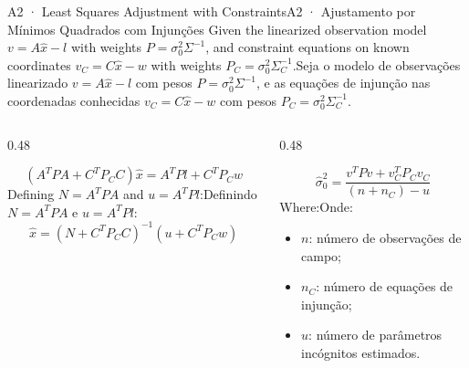 \documentclass[aspectratio=169,11pt]{beamer}
\newcommand{\tr}[2]{\ifEN#2\else#1\fi}
\begin{document}
\begin{frame}{\tr{A2 · Ajustamento por Mínimos Quadrados com Injunções}{A2 · Least Squares Adjustment with Constraints}}
  \scriptsize
  \tr{Seja o modelo de observações linearizado $v = A \hat{x} - l$ com pesos $P = \sigma_0^2 \Sigma^{-1}$, e as equações de injunção nas coordenadas conhecidas $v_C = C \hat{x} - w$ com pesos $P_C = \sigma_0^2 \Sigma_C^{-1}$.}{
  Given the linearized observation model $v = A \hat{x} - l$ with weights $P = \sigma_0^2 \Sigma^{-1}$, and constraint equations on known coordinates $v_C = C \hat{x} - w$ with weights $P_C = \sigma_0^2 \Sigma_C^{-1}$.}
  \vspace{0.15cm}
  \begin{columns}[onlytextwidth]
    \begin{column}{0.48\textwidth}
      \begin{tcolorbox}[colback=mStoneLight, colframe=mStone, title={\tr{Sistema Normal Combinado}{Combined Normal System}}]
        \scriptsize
        \begin{equation*}
          (A^T P A + C^T P_C C) \hat{x} = A^T P l + C^T P_C w
        \end{equation*}
        \tr{Definindo $N = A^T P A$ e $u = A^T P l$:}{Defining $N = A^T P A$ and $u = A^T P l$:}
        \begin{equation*}
          \hat{x} = (N + C^T P_C C)^{-1} (u + C^T P_C w)
        \end{equation*}
      \end{tcolorbox}
    \end{column}
    \begin{column}{0.48\textwidth}
      \begin{tcolorbox}[colback=mTeal!8, colframe=mTeal, title={\tr{Variância a Posteriori}{A Posteriori Variance}}]
        \scriptsize
        \begin{equation*}
          \hat{\sigma}_0^2 = \frac{v^T P v + v_C^T P_C v_C}{(n + n_C) - u}
        \end{equation*}
        \tr{Onde:}{Where:}
        \begin{itemize}
          \tiny
          \item $n$: número de observações de campo;
          \item $n_C$: número de equações de injunção;
          \item $u$: número de parâmetros incógnitos estimados.
        \end{itemize}
      \end{tcolorbox}
    \end{column}
  \end{columns}
\end{frame}
\end{document}
